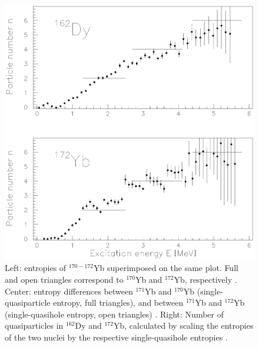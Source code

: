 \documentclass[sort&compress,final,numberedheadings]{aipproc}
\begin{document}
\begin{figure}
\hspace*{0.5cm}
\includegraphics[totalheight=5cm,angle=0,bb=42 157 527 651,clip]{fig3c.ps}
\caption{Left: entropies of $^{170-172}$Yb superimposed on the same plot. Full 
and open triangles correspond to $^{170}$Yb and $^{172}$Yb, respectively
\protect\cite{AS04}. Center: entropy differences between $^{171}$Yb and 
$^{170}$Yb (single-quasiparticle entropy, full triangles), and between 
$^{171}$Yb and $^{172}$Yb (single-quasihole entropy, open triangles)
\protect\cite{AS04}. Right: Number of quasiparticles in $^{162}$Dy and 
$^{172}$Yb, calculated by scaling the entropies of the two nuclei by the 
respective single-quasihole entropies \protect\cite{GB00}.} 
\label{fig:ybentr}
\end{figure}
\end{document}
